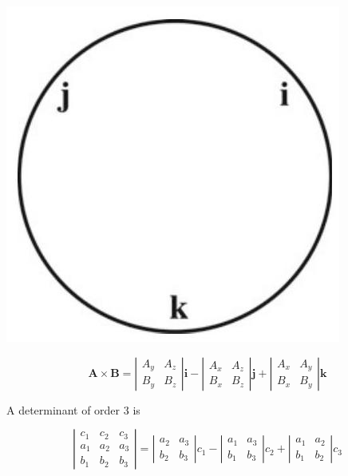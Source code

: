 \documentclass[10pt]{article}
\begin{document}
\begin{center}
\includegraphics[max width=\textwidth]{2024_09_13_db1f357d2aad0a03eb2eg-020}
\end{center}

$$
\mathbf{A} \times \mathbf{B}=\left|\begin{array}{ll}
A_{y} & A_{z} \\
B_{y} & B_{z}
\end{array}\right| \mathbf{i}-\left|\begin{array}{ll}
A_{x} & A_{z} \\
B_{x} & B_{z}
\end{array}\right| \mathbf{j}+\left|\begin{array}{ll}
A_{x} & A_{y} \\
B_{x} & B_{y}
\end{array}\right| \mathbf{k}
$$

A determinant of order 3 is

$$
\left|\begin{array}{lll}
c_{1} & c_{2} & c_{3} \\
a_{1} & a_{2} & a_{3} \\
b_{1} & b_{2} & b_{3}
\end{array}\right|=\left|\begin{array}{ll}
a_{2} & a_{3} \\
b_{2} & b_{3}
\end{array}\right| c_{1}-\left|\begin{array}{ll}
a_{1} & a_{3} \\
b_{1} & b_{3}
\end{array}\right| c_{2}+\left|\begin{array}{ll}
a_{1} & a_{2} \\
b_{1} & b_{2}
\end{array}\right| c_{3}
$$
\end{document}
